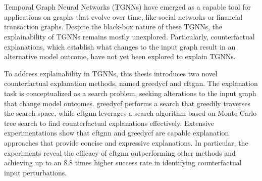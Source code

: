 \thispagestyle{empty}\section*{}

Temporal Graph Neural Networks (TGNNs) have emerged as a capable tool for applications on graphs that evolve over time, like social networks or financial transaction graphs. Despite the black-box nature of these TGNNs, the explainability of TGNNs remains mostly unexplored. Particularly, counterfactual explanations, which establish what changes to the input graph result in an alternative model outcome, have not yet been explored to explain TGNNs.

To address explainability in TGNNs, this thesis introduces two novel counterfactual explanation methods, named \acrfull{greedycf} and \acrfull{cftgnn}. The explanation task is conceptualized as a search problem, seeking alterations to the input graph that change model outcomes.
\acrshort{greedycf} performs a search that greedily traverses the search space, while \acrshort{cftgnn} leverages a search algorithm based on Monte Carlo tree search to find counterfactual explanations effectively. Extensive experimentations show that \acrshort{cftgnn} and \acrshort{greedycf} are capable explanation approaches that provide concise and expressive explanations. In particular, the experiments reveal the efficacy of \acrshort{cftgnn} outperforming other methods and achieving up to an 8.8 times higher success rate in identifying counterfactual input perturbations.








